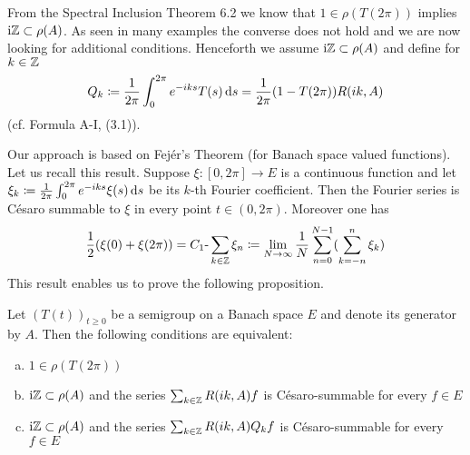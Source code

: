 From the Spectral Inclusion Theorem 6.2 we know that $1 \in \rho(T(2\pi))$ implies $\mathrm{i}\mathbb{Z} \subset \rho(A)$.
As seen in many examples the converse does not hold and we are now looking for additional conditions.
Henceforth we assume $\mathrm{i}\mathbb{Z} \subset \rho(A)$ and define for $k \in \mathbb{Z}$
\begin{equation}\label{eq:a3-7.8}
Q_{k}\coloneqq \frac{1}{2\pi}\int_{0}^{2\pi} e^{-iks}T(s)\mathop{}\!\mathrm{d}{s} = \frac{1}{2\pi}(1 - T(2\pi))R(ik,A)
\end{equation}
(cf. Formula A-I, (3.1)).

Our approach is based on Fejér's Theorem (for Banach space valued functions).
Let us recall this result.
Suppose $\xi \colon [0,2\pi] \to E$ is a continuous function and let $\xi_{k}\coloneqq \frac{1}{2\pi}\int_{0}^{2\pi} e^{-iks}\xi(s)\mathop{}\!\mathrm{d}{s}$ be its $k$-th Fourier coefficient.
Then the Fourier series is Césaro summable to $\xi$ in every point $t \in (0,2\pi)$.
Moreover one has
\begin{equation}\label{eq:a3-7.9}
\frac{1}{2}(\xi(0) + \xi(2\pi)) = C_{1}\text{-}\sum_{k\in\mathbb{Z}} \xi_{n} \coloneqq \lim_{N\to\infty} \frac{1}{N}\sum_{n=0}^{N-1}(\sum_{k=-n}^{n} \xi_{k})
\end{equation}
This result enables us to prove the following proposition.
\begin{proposition}\label{prop:a3-7.8}
Let $(T(t))_{t\geq 0}$ be a semigroup on a Banach space $E$ and denote its generator by $A$.
Then the following conditions are equivalent:
\begin{enumerate}[(a)]
\item $1 \in \rho(T(2\pi))$

\item 
$\mathrm{i}\mathbb{Z} \subset \rho(A)$ and the series $\sum_{k\in\mathbb{Z}} R(ik,A)f$ is Césaro-summable for every $f \in E$

\item 
$\mathrm{i}\mathbb{Z} \subset \rho(A)$ and the series $\sum_{k\in\mathbb{Z}} R(ik,A)Q_{k}f$ is Césaro-summable for every $f \in E$

\end{enumerate}
\end{proposition}
